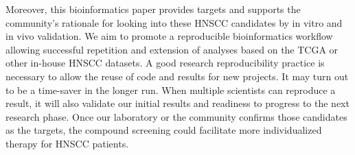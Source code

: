 \documentclass[jpm,article,submit,moreauthors,pdftex]{Definitions/mdpi}
\begin{document}
\begin{paracol}{2}
Moreover, this bioinformatics paper provides targets and supports the community's rationale for looking into these HNSCC candidates by in vitro and in vivo validation. %
We aim to promote a reproducible bioinformatics\cite{Preeyanon2014}\cite{Kulkarni2018} workflow allowing successful repetition and extension of analyses based on the TCGA or other in-house HNSCC datasets. %
A good research reproducibility practice is necessary to allow the reuse of code and results for new projects.
It may turn out to be a time-saver in the longer run.
When multiple scientists can reproduce a result, it will also validate our initial results and readiness to progress to the next research phase. 
Once our laboratory or the community confirms those candidates as the targets, the compound screening\cite{Yang2004}\cite{Hsu2011}\cite{Pathak2021} could facilitate more individualized therapy for HNSCC patients.








\end{paracol}
\end{document}
